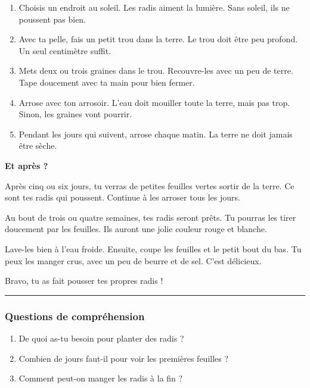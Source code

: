 \documentclass[
  french,
  14pt,
  a4paper,
]{extarticle}
\providecommand{\tightlist}{%
  \setlength{\itemsep}{0pt}\setlength{\parskip}{0pt}}
\begin{document}
\begin{enumerate}
\def\labelenumi{\arabic{enumi}.}
\item
  Choisis un endroit au soleil. Les radis aiment la lumière. Sans
  soleil, ils ne poussent pas bien.
\item
  Avec ta pelle, fais un petit trou dans la terre. Le trou doit être peu
  profond. Un seul centimètre suffit.
\item
  Mets deux ou trois graines dans le trou. Recouvre-les avec un peu de
  terre. Tape doucement avec ta main pour bien fermer.
\item
  Arrose avec ton arrosoir. L'eau doit mouiller toute la terre, mais pas
  trop. Sinon, les graines vont pourrir.
\item
  Pendant les jours qui suivent, arrose chaque matin. La terre ne doit
  jamais être sèche.
\end{enumerate}

\textbf{Et après ?}

Après cinq ou six jours, tu verras de petites feuilles vertes sortir de
la terre. Ce sont tes radis qui poussent. Continue à les arroser tous
les jours.

Au bout de trois ou quatre semaines, tes radis seront prêts. Tu pourras
les tirer doucement par les feuilles. Ils auront une jolie couleur rouge
et blanche.

Lave-les bien à l'eau froide. Ensuite, coupe les feuilles et le petit
bout du bas. Tu peux les manger crus, avec un peu de beurre et de sel.
C'est délicieux.

Bravo, tu as fait pousser tes propres radis !

\begin{center}\rule{0.5\linewidth}{0.5pt}\end{center}

\subsubsection{Questions de
compréhension}\label{questions-de-compruxe9hension-5}

\begin{enumerate}
\def\labelenumi{\arabic{enumi}.}
\tightlist
\item
  De quoi as-tu besoin pour planter des radis ?
\item
  Combien de jours faut-il pour voir les premières feuilles ?
\item
  Comment peut-on manger les radis à la fin ?
\end{enumerate}
\end{document}
